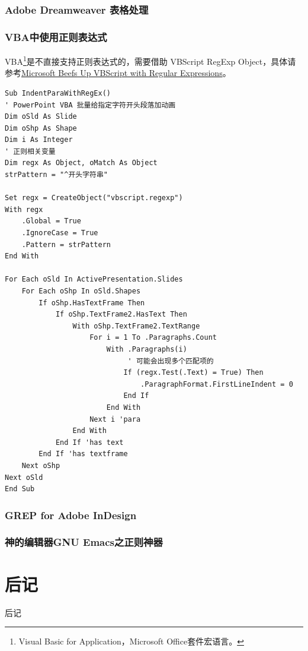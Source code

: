 \documentclass[12pt,a4paper,twoside]{ctexart}
\begin{document}
\subsubsection{Adobe Dreamweaver 表格处理}
\label{sec:adobe-dw}

\subsubsection{VBA中使用正则表达式}
\label{sec:vba}
VBA\footnote{Visual Basic for Application，Microsoft Office套件宏语言。}是不直接支持正则表达式的，需要借助 VBScript RegExp Object，具体请参考\href{http://msdn.microsoft.com/en-us/library/ms974570.aspx}{Microsoft Beefs Up VBScript with Regular Expressions}。
\begin{lstlisting}[language=VBScript]
Sub IndentParaWithRegEx()
' PowerPoint VBA 批量给指定字符开头段落加动画
Dim oSld As Slide
Dim oShp As Shape
Dim i As Integer
' 正则相关变量
Dim regx As Object, oMatch As Object
strPattern = "^开头字符串"

Set regx = CreateObject("vbscript.regexp")
With regx
    .Global = True
    .IgnoreCase = True
    .Pattern = strPattern
End With
    
For Each oSld In ActivePresentation.Slides
    For Each oShp In oSld.Shapes
        If oShp.HasTextFrame Then
            If oShp.TextFrame2.HasText Then
                With oShp.TextFrame2.TextRange
                    For i = 1 To .Paragraphs.Count
                        With .Paragraphs(i)
                             ' 可能会出现多个匹配项的
                            If (regx.Test(.Text) = True) Then
                                .ParagraphFormat.FirstLineIndent = 0
                            End If
                        End With
                    Next i 'para
                End With
            End If 'has text
        End If 'has textframe
    Next oShp
Next oSld
End Sub  
\end{lstlisting}

\subsubsection{GREP for Adobe InDesign}
\label{sec:indesign}

\subsubsection{神的编辑器GNU Emacs之正则神器}
\label{sec:emacs}

\section{后记}
\label{sec:postscript}

后记 \par
\end{document}
